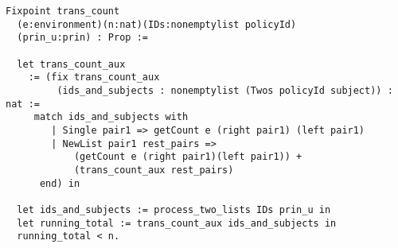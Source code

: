 \begin{lstlisting}
Fixpoint trans_count 
  (e:environment)(n:nat)(IDs:nonemptylist policyId)
  (prin_u:prin) : Prop := 

  let trans_count_aux 
    := (fix trans_count_aux
         (ids_and_subjects : nonemptylist (Twos policyId subject)) : nat :=
     match ids_and_subjects with
        | Single pair1 => getCount e (right pair1) (left pair1)
        | NewList pair1 rest_pairs =>
            (getCount e (right pair1)(left pair1)) +
            (trans_count_aux rest_pairs)
      end) in
  
  let ids_and_subjects := process_two_lists IDs prin_u in
  let running_total := trans_count_aux ids_and_subjects in
  running_total < n.
\end{lstlisting}
